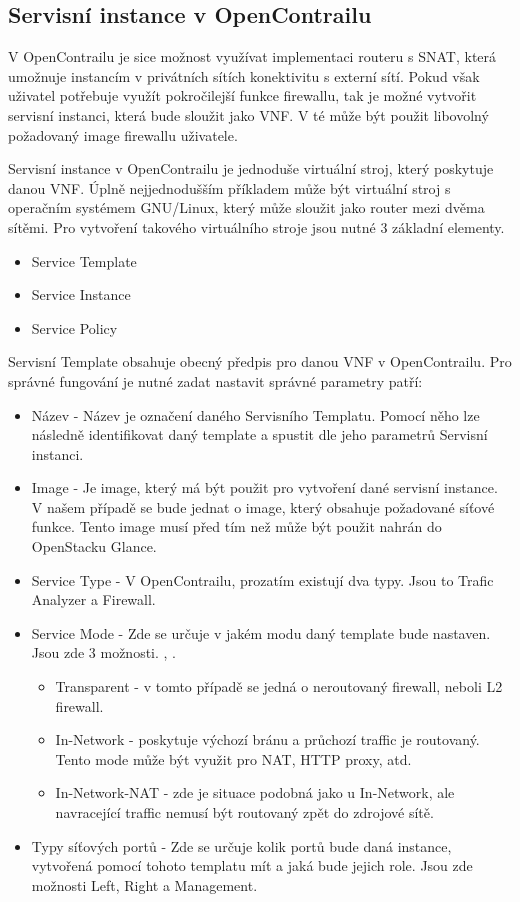 \subsection{Servisní instance v OpenContrailu}

V OpenContrailu je sice možnost využívat implementaci routeru s SNAT, která umožnuje instancím v privátních sítích konektivitu s externí sítí. Pokud však uživatel potřebuje využít pokročilejší funkce firewallu, tak je možné vytvořit servisní instanci, která bude sloužit jako VNF. V té může být použit libovolný požadovaný image firewallu uživatele.

Servisní instance v OpenContrailu je jednoduše virtuální stroj, který poskytuje danou VNF. Úplně nejjednodušším příkladem může být virtuální stroj s operačním systémem GNU/Linux, který může sloužit jako router mezi dvěma sítěmi. Pro vytvoření takového virtuálního stroje jsou nutné 3 základní elementy. 

\begin{itemize}
  \item Service Template
  \item Service Instance
  \item Service Policy
\end{itemize}

Servisní Template obsahuje obecný předpis pro danou VNF v OpenContrailu. Pro správné fungování je nutné zadat nastavit správné parametry patří:

\begin{itemize}
\item Název - Název je označení daného Servisního Templatu. Pomocí něho lze následně identifikovat daný template a spustit dle jeho parametrů Servisní instanci. 
\item Image - Je image, který má být použit pro vytvoření dané servisní instance. V našem případě se bude jednat o image, který obsahuje požadované síťové funkce. Tento image musí před tím než může být použit  nahrán do OpenStacku Glance.
\item Service Type - V OpenContrailu, prozatím existují dva typy. Jsou to Trafic Analyzer a Firewall.
\item Service Mode - Zde se určuje v jakém modu daný template bude nastaven. Jsou zde 3 možnosti. , .

  \begin{itemize}
  \item Transparent - v tomto případě se jedná o neroutovaný firewall, neboli L2 firewall.
  \item In-Network - poskytuje výchozí bránu a průchozí traffic je routovaný. Tento mode může být využit pro NAT, HTTP proxy, atd.
  \item In-Network-NAT - zde je situace podobná jako u In-Network, ale navracející traffic nemusí být routovaný zpět do zdrojové sítě.
  \end{itemize}

\item Typy síťových portů - Zde se určuje kolik portů bude daná instance, vytvořená pomocí tohoto templatu mít a jaká bude jejich role. Jsou zde možnosti Left, Right a Management. 
\end{itemize}

